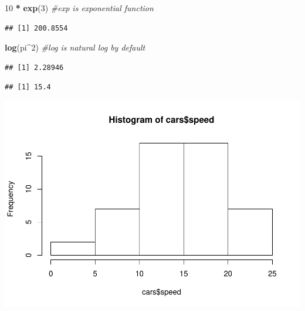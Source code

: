 \documentclass[
]{book}
\newenvironment{Shaded}{\begin{snugshade}}{\end{snugshade}}
\newcommand{\CommentTok}[1]{\textcolor[rgb]{0.56,0.35,0.01}{\textit{#1}}}
\newcommand{\DecValTok}[1]{\textcolor[rgb]{0.00,0.00,0.81}{#1}}
\newcommand{\KeywordTok}[1]{\textcolor[rgb]{0.13,0.29,0.53}{\textbf{#1}}}
\newcommand{\NormalTok}[1]{#1}
\newcommand{\OperatorTok}[1]{\textcolor[rgb]{0.81,0.36,0.00}{\textbf{#1}}}
\newcommand{\StringTok}[1]{\textcolor[rgb]{0.31,0.60,0.02}{#1}}
\theoremstyle{definition}
\theoremstyle{definition}
\theoremstyle{definition}
\theoremstyle{remark}
\begin{document}
\begin{Shaded}
\begin{Highlighting}[]
\DecValTok{10} \OperatorTok{*}\StringTok{ }\KeywordTok{exp}\NormalTok{(}\DecValTok{3}\NormalTok{) }\CommentTok{#exp is exponential function}
\end{Highlighting}
\end{Shaded}

\begin{verbatim}
## [1] 200.8554
\end{verbatim}

\begin{Shaded}
\begin{Highlighting}[]
\KeywordTok{log}\NormalTok{(pi}\OperatorTok{^}\DecValTok{2}\NormalTok{) }\CommentTok{#log is natural log by default}
\end{Highlighting}
\end{Shaded}

\begin{verbatim}
## [1] 2.28946
\end{verbatim}

\begin{Shaded}
\end{Shaded}

\begin{verbatim}
## [1] 15.4
\end{verbatim}

\begin{Shaded}
\end{Shaded}

\includegraphics{StatisticalMethods_files/figure-latex/unnamed-chunk-21-1.pdf}
\end{document}
